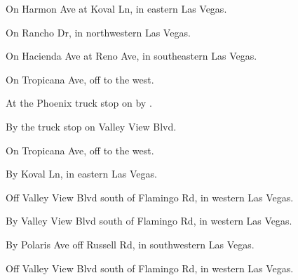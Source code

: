 

\begin{LocationList}

On Harmon Ave at Koval Ln, in eastern Las Vegas.

On Rancho Dr, in northwestern Las Vegas.

On Hacienda Ave at Reno Ave, in southeastern Las Vegas.

On Tropicana Ave, off   to the west.

At the Phoenix truck stop on  by  .

\Location{\GarageHQ \Garage}
By the truck stop on Valley View Blvd.

\Location{\RecruitmentAgency \Recruitment}
On Tropicana Ave, off   to the west.

By Koval Ln, in eastern Las Vegas.

Off Valley View Blvd south of Flamingo Rd, in western Las Vegas.

By Valley View Blvd south of Flamingo Rd, in western Las Vegas.

By Polaris Ave off Russell Rd, in southwestern Las Vegas.

Off Valley View Blvd south of Flamingo Rd, in western Las Vegas.

\end{LocationList}
